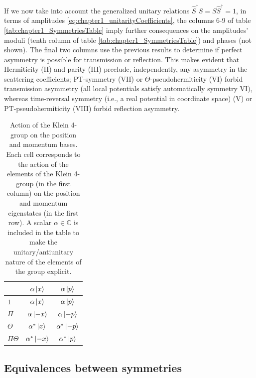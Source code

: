 If we now take into account the generalized unitary relations $\widehat{S}^\dagger S=S\widehat{S}^\dagger=1$, in terms of amplitudes \eqref{eq:chapter1_unitarityCoefficients}, the columns 6-9 of table \ref{tab:chapter1_SymmetriesTable} imply further consequences on the amplitudes' moduli (tenth column of table \ref{tab:chapter1_SymmetriesTable}) and phases (not shown). The final two columns use the previous results to determine if perfect asymmetry is possible for transmission or reflection.
This makes evident that Hermiticity (II) and parity (III) preclude, independently, any asymmetry in the scattering coefficients;
PT-symmetry (VII) or  $\Theta$-pseudohermiticity
(VI) forbid transmission asymmetry (all local potentials  satisfy automatically
symmetry VI),  whereas time-reversal symmetry (i.e., a real potential in coordinate space)
(V) or  PT-pseudohermiticity (VIII) forbid reflection asymmetry.


\begin{table}
  \caption{Action of the Klein 4-group on the position and momentum bases. Each cell corresponds to the action of the elements of the Klein 4-group (in the first column) on the position and momentum eigenstates (in the first row). A scalar $\alpha \in \mathbb{C}$ is included in the table to make the unitary/antiunitary nature of the elements of the group explicit.}
  \label{tab:chapter1_KleinGroupOnPosAndMomentBases}
  \center
  \begin{tabular}{lcc}
    \hline\hline
    & $\alpha \ket{x}$ & $\alpha \ket{p}$\\
    \hline
    $1$ & $\alpha \ket{x}$ & $\alpha \ket{p}$\\ %
    $\Pi$  & $\alpha \ket{-x}$ & $\alpha \ket{-p}$\\ %
    $\Theta$ & $\alpha^* \ket{x}$ & $\alpha^* \ket{-p}$\\ %
    $\Pi\Theta$ & $\alpha^* \ket{-x}$ & $\alpha^* \ket{p}$\\ %
    \hline\hline
  \end{tabular}
\end{table}




\subsection{Equivalences between symmetries}

